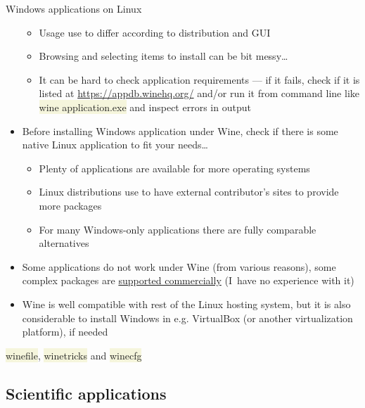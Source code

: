 \documentclass[compress, ucs, xelatex, 11pt, xcolor=svgnames, aspectratio=169,
	hyperref={
		bookmarks=true,
		unicode=true,
		colorlinks=true,
		pdftitle={Linux, command line and MetaCentrum},
		plainpages=false,
		pdfauthor={Vojtech Zeisek},
		pdfsubject={Course about use of Linux command line, writing shell scripts and using MetaCentrum of CESNET},
		pdfcreator={XeLaTeX},
		pdfkeywords={Linux, GNU, BASH, shell, command line, MetaCentrum},
		linkcolor=DarkRed, %
		anchorcolor=DarkBlue, %
		citecolor=Indigo, %
		filecolor=NavyBlue, %
		menucolor=DarkMagenta, %
		urlcolor=DarkBlue, %
		pdftex},
	url={hyphens, lowtilde} %
	]{beamer}
\renewcommand{\texttt}[1]{\colorbox{Beige}{{\ttfamily #1}}}
\begin{document}
\begin{frame}[allowframebreaks]{Windows applications on Linux}
\begin{itemize}
		\begin{itemize}
			\item Usage use to differ according to distribution and GUI
			\item Browsing and selecting items to install can be bit messy\ldots
			\item It can be hard to check application requirements --- if it fails, check if it is listed at \url{https://appdb.winehq.org/} and/or run it from command line like \texttt{wine application.exe} and inspect errors in output
		\end{itemize}
		\item Before installing Windows application under Wine, check if there is some native Linux application to fit your needs\ldots
		\begin{itemize}
			\item Plenty of applications are available for more operating systems
			\item Linux distributions use to have external contributor's sites to provide more packages
			\item For many Windows-only applications there are fully comparable alternatives
		\end{itemize}
		\item Some applications do not work under Wine (from various reasons), some complex packages are \href{https://www.codeweavers.com/}{supported commercially} (I~have no experience with it)
		\item Wine is well compatible with rest of the Linux hosting system, but it is also considerable to install Windows in e.g. VirtualBox (or another virtualization platform), if needed
	\end{itemize}
	\begin{center}
		\texttt{[image: wine.png]}
	\end{center}
	\begin{flushright}
		\texttt{winefile}, \texttt{winetricks} and \texttt{winecfg}
	\end{flushright}
\end{frame}

\subsection{Scientific applications}
\end{document}
